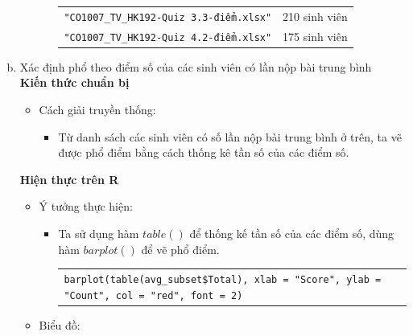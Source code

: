 \documentclass[a4paper]{article}
\theoremstyle{definition}
\begin{document}
\begin{enumerate}[a)]
\begin{itemize}
\begin{itemize}
\begin{center}
\begin{tabular}{l l}
                     \texttt{"CO1007\_TV\_HK192-Quiz 3.3-điểm.xlsx"} & 210 sinh viên\\ 
                     \texttt{"CO1007\_TV\_HK192-Quiz 4.2-điểm.xlsx"} & 175 sinh viên\\ 
                \end{tabular}
            \end{center}        
        \end{itemize}
    \end{itemize}
    \bf\item {Xác định phổ theo điểm số của các sinh viên có lần nộp bài trung bình}\\[6pt]
    \bf Kiến thức chuẩn bị\normalfont
    \begin{itemize}
        \item Cách giải truyền thống:
        \begin{itemize}
            \item Từ danh sách các sinh viên có số lần nộp bài trung bình ở trên, ta vẽ được phổ điểm bằng cách thống kê tần số của các điểm số.
        \end{itemize}
    \end{itemize}
    \bf Hiện thực trên R\normalfont
    \begin{itemize}
        \item Ý tưởng thực hiện:
        \begin{itemize}
            \item Ta sử dụng hàm $table()$ để thống kế tần số của các điểm số, dùng hàm $barplot()$ để vẽ phổ điểm.
            \begin{center}
                \begin{tabular}{p{13cm}}
                    \texttt{barplot(table(avg\_subset\$Total), xlab = "Score", ylab = "Count", col = "red", font = 2)}
                \end{tabular}
            \end{center}
        \end{itemize}
        \item Biểu đồ:\\
        \begin{center}
            \begin{tabular}{c c}

\end{tabular}
\end{center}
\end{itemize}
\end{enumerate}
\end{document}
